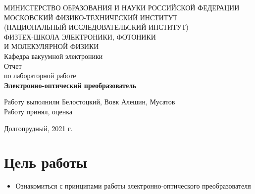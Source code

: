 \documentclass[a4paper,12pt]{article}
\begin{document}
 

\begin{titlepage}
	\begin{center}
		\large 	МИНИСТЕРСТВО ОБРАЗОВАНИЯ И НАУКИ РОССИЙСКОЙ ФЕДЕРАЦИИ\\
				МОСКОВСКИЙ ФИЗИКО-ТЕХНИЧЕСКИЙ ИНСТИТУТ \\
				(НАЦИОНАЛЬНЫЙ ИССЛЕДОВАТЕЛЬСКИЙ ИНСТИТУТ)\\ 
				ФИЗТЕХ-ШКОЛА ЭЛЕКТРОНИКИ, ФОТОНИКИ \\
				И МОЛЕКУЛЯРНОЙ ФИЗИКИ \\
		
		
		\vspace{4.0 cm}
		\LARGE{Кафедра вакуумной электроники \\ 
		Отчет \\
		по лабораторной работе} \\ 
		\LARGE \textbf{Электронно-оптический преобразователь} \\

	\end{center}
	\vspace{3 cm} \large

	\begin{flushleft}
		Работу выполнили \hspace{0.5cm}  \underline{\hspace{3cm}} Белостоцкий, Вовк Алешин, Мусатов \\	
		\vspace{1cm}
		Работу принял, оценка \hspace{0cm} \underline{\hspace{3cm}}
	\end{flushleft}

	
	\vfill

	\begin{center}
	Долгопрудный, 2021 г.
	\end{center}
\end{titlepage}                                                                      

\section*{Цель работы} 
\begin{itemize}
\item Ознакомиться с принципами работы электронно-оптического преобразователя
\end{itemize}
\end{document}
